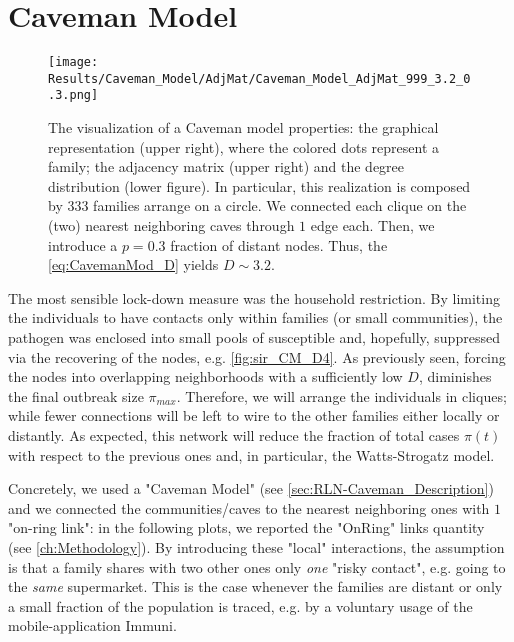 \documentclass[a4paper,10pt,twoside]{book} %
\theoremstyle{definition}
\begin{document}
\clearpage
\section{Caveman Model}
\label{sec:res_CM}
\begin{figure}[t]
	\centering
	\texttt{[image: Results/Caveman\_Model/AdjMat/Caveman\_Model\_AdjMat\_999\_3.2\_0.3.png]}
	\caption{The visualization of a Caveman model properties: the graphical representation (upper right), where the colored dots represent a family; the adjacency matrix (upper right) and the degree distribution (lower figure). In particular, this realization is composed by 333 families arrange on a circle. We connected each clique on the (two) nearest neighboring caves through $1$ edge each. Then, we introduce a $p = 0.3$ fraction of distant nodes. Thus, the \autoref{eq:CavemanMod_D} yields $D \sim 3.2$.}
	\label{fig:CM_AdjMat_p0.3}
\end{figure}
The most sensible lock-down measure was the household restriction. By limiting the individuals to have contacts only within families (or small communities), the pathogen was enclosed into small pools of susceptible and, hopefully, suppressed via the recovering of the nodes, e.g. \autoref{fig:sir_CM_D4}. As previously seen, forcing the nodes into overlapping neighborhoods with a sufficiently low $ D$, diminishes the final outbreak size $ \pi_{max}$. Therefore, we will arrange the individuals in cliques; while fewer connections will be left to wire to the other families either locally or distantly. As expected, this network will reduce the fraction of total cases $\pi(t)$ with respect to the previous ones and, in particular, the Watts-Strogatz model.

Concretely, we used a "Caveman Model" (see \autoref{sec:RLN-Caveman_Description}) and we connected the communities/caves to the nearest neighboring ones with $ 1$ "on-ring link": in the following plots, we reported the "OnRing" links quantity (see \autoref{ch:Methodology}). By introducing these "local" interactions, the assumption is that a family shares with two other ones only \textit{one} "risky contact", e.g. going to the \textit{same} supermarket. This is the case whenever the families are distant or only a small fraction of the population is traced, e.g. by a voluntary usage of the mobile-application Immuni.
\end{document}
